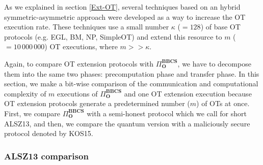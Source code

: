 As we explained in section \ref{Ext-OT}, several techniques based on an hybrid symmetric-asymmetric approach were developed as a way to increase the OT execution rate. These techniques use a small number $\kappa$ ($=128$) of base OT protocols (e.g. EGL, BM, NP, SimpleOT) and extend this resource to $m$ ($=10\,000\,000$) OT executions, where $ m >> \kappa$. 

Again, to compare OT extension protocols with $\Pi^{\textbf{BBCS}}_{\textbf{O}}$, we have to decompose them into the same two phases: precomputation phase and transfer phase. In this section, we make a bit-wise comparison of the communication and computational complexity of $m$ executions of $\Pi^{\textbf{BBCS}}_{\textbf{O}}$ and one OT extension execution because OT extension protocols generate a predetermined number ($m$) of OTs at once. First, we compare $\Pi^{\textbf{BBCS}}_{\textbf{O}}$ with a semi-honest protocol which we call for short ALSZ13, and then, we compare the quantum version with a maliciously secure protocol denoted by KOS15.

\subsubsection{ALSZ13 comparison}

